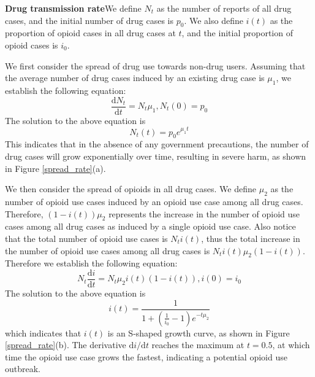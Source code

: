 \documentclass[13pt]{ctexart}
\begin{document}
\textbf{Drug transmission rate}\cite{SIR_mu}\quad We define $N_t$ as the number of reports of all drug cases, and the initial number of drug cases is $p_0$. We also define $i(t)$ as the proportion of opioid cases in all drug cases at $t$, and the initial proportion of opioid cases is $i_0$.

We first consider the spread of drug use towards non-drug users. Assuming that the average number of drug cases induced by an existing drug case is $\mu_1$, we establish the following equation:
\begin{equation}
	\frac{\mathrm{d}N_t}{\mathrm{d}t}=N_t\mu_1,N_t(0)=p_0
	\label{S}
\end{equation}
The solution to the above equation is
\begin{equation}
N_t(t)=p_0e^{\mu_1t}
\end{equation}
This indicates that in the absence of any government precautions, the number of drug cases will grow exponentially over time, resulting in severe harm, as shown in Figure \ref{spread_rate}(a).

We then consider the spread of opioids in all drug cases. We define $\mu_2$ as the number of opioid use cases induced by an opioid use case among all drug cases. Therefore, $(1-i(t))\mu_2$ represents the increase in the number of opioid use cases among all drug cases as induced by a single opioid use case. Also notice that the total number of opioid use cases is $N_ti(t)$, thus the total increase in the number of opioid use cases among all drug cases is $N_ti(t)\mu_2(1-i(t))$. Therefore we establish the following equation:
\begin{equation}
	N_t \frac{\mathrm{d}i}{\mathrm{d}t}=
	N_t \mu_2 i(t)(1-i(t)),i(0)=i_0 
	\label{SI}
\end{equation}
The solution to the above equation is
\begin{equation}
i(t)=\frac{1}{1+(\frac{1}{i_0}-1)e^{-t\mu_2}}
\end{equation}
which indicates that $i(t)$ is an S-shaped growth curve, as shown in Figure \ref{spread_rate}(b). The derivative $\mathrm{d}i/\mathrm{d}t$ reaches the maximum at $t=0.5$, at which time the opioid use case grows the fastest, indicating a potential opioid use outbreak.
\end{document}
